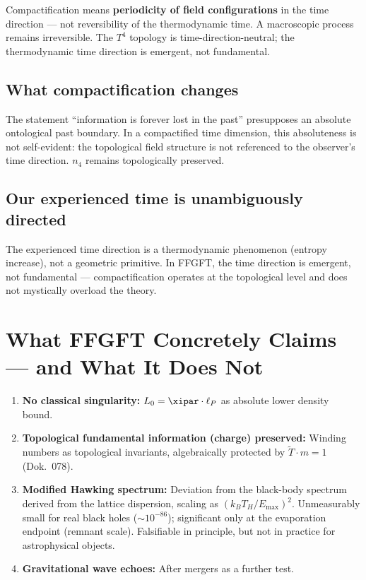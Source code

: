 \begin{wichtig}
Compactification means \textbf{periodicity of field configurations} in the time direction --- not reversibility of the thermodynamic time. A macroscopic process remains irreversible. The $T^4$ topology is time-direction-neutral; the thermodynamic time direction is emergent, not fundamental.
\end{wichtig}

\subsection{What compactification changes}

The statement ``information is forever lost in the past'' presupposes an absolute ontological past boundary. In a compactified time dimension, this absoluteness is not self-evident: the topological field structure is not referenced to the observer's time direction. $n_4$ remains topologically preserved.

\subsection{Our experienced time is unambiguously directed}

The experienced time direction is a thermodynamic phenomenon (entropy increase), not a geometric primitive. In FFGFT, the time direction is emergent, not fundamental --- compactification operates at the topological level and does not mystically overload the theory.

\section{What FFGFT Concretely Claims --- and What It Does Not}

\begin{enumerate}
  \item \textbf{No classical singularity:} $L_0 = \xipar \cdot \ell_P$ as absolute lower density bound.
  \item \textbf{Topological fundamental information (charge) preserved:} Winding numbers as topological invariants, algebraically protected by $\tilde{T} \cdot m = 1$ (Dok.~078).
  \item \textbf{Modified Hawking spectrum:} Deviation from the black-body spectrum derived from the lattice dispersion, scaling as $(k_B T_H/E_\text{max})^2$. Unmeasurably small for real black holes ($\sim 10^{-86}$); significant only at the evaporation endpoint (remnant scale). Falsifiable in principle, but not in practice for astrophysical objects.
  \item \textbf{Gravitational wave echoes:} After mergers as a further test.
\end{enumerate}

